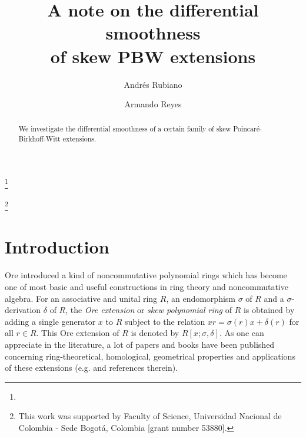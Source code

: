 \documentclass{amsart}
\theoremstyle{definition}
\theoremstyle{remark}
\numberwithin{equation}{section}
\begin{document}
\title[On the Differential Smoothness of Skew PBW Extensions] {A note on the differential smoothness \\ of skew PBW extensions}


\author{Andr\'es Rubiano}
\address{Universidad Nacional de Colombia - Sede Bogot\'a}
\address{Universidad ECCI}
\thanks{}


\author{Armando Reyes}
\address{Universidad Nacional de Colombia - Sede Bogot\'a}

\thanks{This work was supported by Faculty of Science, Universidad Nacional de Colombia - Sede Bogot\'a, Colombia [grant number 53880].}



\date{}


\begin{abstract} 

We investigate the differential smoothness of a certain family of skew Poincar\'e-Birkhoff-Witt extensions.

\end{abstract}

\maketitle


\section{Introduction}

Ore \cite{Ore1931, Ore1933} introduced a kind of noncommutative polynomial rings which has become one of most basic and useful constructions in ring theory and noncommutative algebra. For an associative and unital ring $R$, an endomorphism $\sigma$ of $R$ and a $\sigma$-derivation $\delta$ of $R$, the {\em Ore extension} or {\em skew polynomial ring} of $R$ is obtained by adding a single generator $x$ to $R$ subject to the relation $xr = \sigma(r) x + \delta(r)$ for all $r\in R$. This Ore extension of $R$ is denoted by $R[x; \sigma, \delta]$. As one can appreciate in the literature, a lot of papers and books have been published concerning ring-theoretical, homological, geometrical properties and applications of these extensions (e.g. \cite{BrownGoodearl2002, BuesoTorrecillasVerschoren2003, Fajardoetal2024, GoodearlLetzter1994, GoodearlWarfield2004, McConnellRobson2001, Li2002, SeilerBook2010} and references therein).
\end{document}
